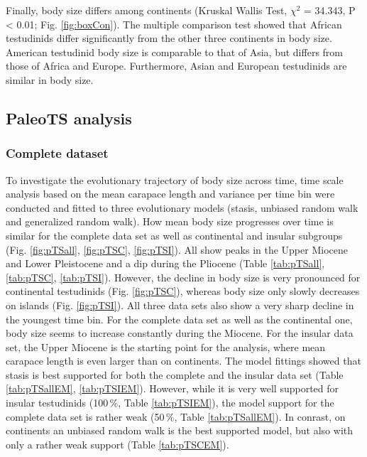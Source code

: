 Finally, body size differs among continents (Kruskal Wallis Test, $\chi^2$ = 34.343, P < 0.01; Fig. \ref{fig:boxCon}). The multiple comparison test showed that African testudinids differ significantly from the other three continents in body size. American testudinid body size is comparable to that of Asia, but differs from those of Africa and Europe. Furthermore, Asian and European testudinids are similar in body size. %



\FloatBarrier

\subsection{PaleoTS analysis}\label{paleots-analysis}


\subsubsection{Complete dataset}\label{all-continental-and-insular}

To investigate the evolutionary trajectory of body size across time, time scale analysis based on the mean carapace length and variance per time bin were conducted and fitted to three evolutionary models (stasis, unbiased random walk and generalized random walk).
How mean body size progresses over time is similar for the complete data set as well as continental and insular subgroups (Fig. \ref{fig:pTSall}, \ref{fig:pTSC}, \ref{fig:pTSI}). All show peaks in the Upper Miocene and Lower Pleistocene and a dip during the Pliocene (Table \ref{tab:pTSall}, \ref{tab:pTSC}, \ref{tab:pTSI}). However, the decline in body size is very pronounced for continental testudinids (Fig. \ref{fig:pTSC}), whereas body size only slowly decreases on islands (Fig. \ref{fig:pTSI}). All three data sets also show a very sharp decline in the youngest time bin.
For the complete data set as well as the continental one, body size seems to increase constantly during the Miocene. For the insular data set, the Upper Miocene is the starting point for the analysis, where mean carapace length is even larger than on continents.
The model fittings showed that stasis is best supported for both the complete and the insular data set (Table \ref{tab:pTSallEM}, \ref{tab:pTSIEM}). However, while it is very well supported for insular testudinids (100\,\%, Table \ref{tab:pTSIEM}), the model support for the complete data set is rather weak (50\,\%, Table \ref{tab:pTSallEM}). In conrast, on continents an unbiased random walk is the best supported model, but also with only a rather weak support (Table \ref{tab:pTSCEM}).\\

